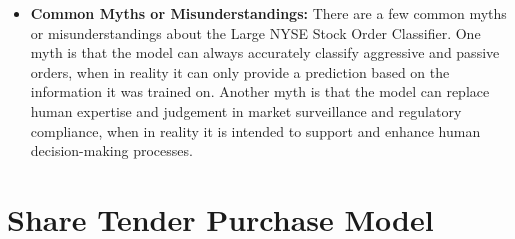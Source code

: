\begin{itemize}
    \item \textbf{Common Myths or Misunderstandings:} There are a few common myths or misunderstandings about the Large NYSE Stock Order Classifier. One myth is that the model can always accurately classify aggressive and passive orders, when in reality it can only provide a prediction based on the information it was trained on. Another myth is that the model can replace human expertise and judgement in market surveillance and regulatory compliance, when in reality it is intended to support and enhance human decision-making processes.
\end{itemize}

\section{Share Tender Purchase Model}

